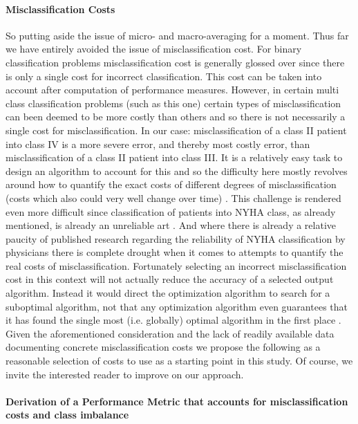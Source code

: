 \documentclass[]{article}
\begin{document}
\paragraph{Misclassification Costs}

So putting aside the issue of micro- and macro-averaging for a moment. Thus far we have entirely avoided the issue of misclassification cost. For binary classification problems misclassification cost is generally glossed over since there is only a single cost for incorrect classification. This cost can be taken into account after computation of performance measures. However, in certain multi class classification problems (such as this one) certain types of misclassification can been deemed to be more costly than others and so there is not necessarily a single cost for misclassification. In our case: misclassification of a class II patient into class IV is a more severe error, and thereby most costly error, than misclassification of a class II patient into class III. It is a relatively easy task to design an algorithm to account for this and so the difficulty here mostly revolves around how to quantify the exact costs of different degrees of misclassification (costs which also could very well change over time) \cite{Kautz2017}. This challenge is rendered even more difficult since classification of patients into NYHA class, as already mentioned, is already an unreliable art \cite{Carroll2014,Goldman1981a,Raphael2007a,Kubo2004}. And where there is already a relative paucity of published research regarding the reliability of NYHA classification by physicians there is complete drought when it comes to attempts to quantify the real costs of misclassification. Fortunately selecting an incorrect misclassification cost in this context will not actually reduce the accuracy of a selected output algorithm. Instead it would direct the optimization algorithm to search for a suboptimal algorithm, not that any optimization algorithm even guarantees that it has found the single most (i.e. globally) optimal algorithm in the first place \cite{Segaran2007}. Given the aforementioned consideration and the lack of readily available data documenting concrete misclassification costs we propose the following as a reasonable selection of costs to use as a starting point in this study. Of course, we invite the interested reader to improve on our approach.

\paragraph{Derivation of a Performance Metric that accounts for misclassification costs and class imbalance}
\end{document}
